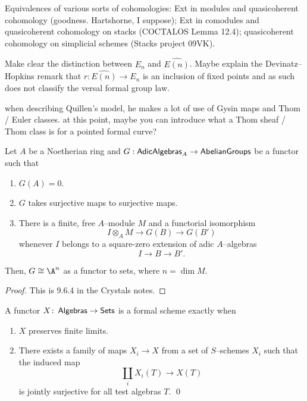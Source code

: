 \documentclass[12pt]{book}
\let\oldTodo\todo
\newcounter{todocounter}
\renewcommand{\todo}{\addtocounter{todocounter}{1}\oldTodo}
\begin{document}
Equivalences of various sorts of cohomologies: Ext in modules and quasicoherent cohomology (goodness. Hartshorne, I suppose); Ext in comodules and quasicoherent cohomology on stacks (COCTALOS Lemma 12.4); quasicoherent cohomology on simplicial schemes (Stacks project 09VK).

Make clear the distinction between $E_n$ and $\widehat{E(n)}$. Maybe explain the Devinatz--Hopkins remark that $r: \widehat{E(n)} \to E_n$ is an inclusion of fixed points and as such does not classify the versal formal group law.


when describing Quillen's model, he makes a lot of use of Gysin maps and Thom / Euler classes. at this point, maybe you can introduce what a Thom sheaf / Thom class is for a pointed formal curve?




\begin{theorem}\label{DetectingFormalVarieties}
Let $A$ be a Noetherian ring and $G: \mathsf{AdicAlgebras}_A \to \mathsf{AbelianGroups}$ be a functor such that
\begin{enumerate}
\item $G(A) = 0$.
\item $G$ takes surjective maps to surjective maps.
\item There is a finite, free $A$--module $M$ and a functorial isomorphism \[I \otimes_A M \to G(B) \to G(B')\] whenever $I$ belongs to a square-zero extension of adic $A$--algebras \[I \to B \to B'.\]
\end{enumerate}
Then, $G \cong \A^n$ as a functor to sets, where $n = \dim M$.
\end{theorem}
\begin{proof}
This is 9.6.4 in the Crystals notes.
\end{proof}



\begin{lemma}
A functor $X\colon\thinspace \mathsf{Algebras} \to \mathsf{Sets}$ is a formal scheme exactly when
\begin{enumerate}
\item $X$ preserves finite limits.
\item There exists a family of maps $X_i \to X$ from a set of $S$--schemes $X_i$ such that the induced map \[\coprod_i X_i(T) \to X(T)\] is jointly surjective for all test algebras $T$. \qed
\end{enumerate}
\end{lemma}
\end{document}
